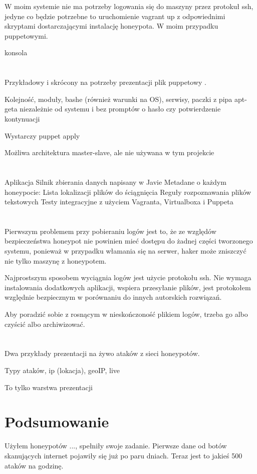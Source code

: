 \documentclass[runningheads,a4paper]{llncs}
\begin{document}
W moim systemie nie ma potrzeby logowania się do maszyny przez protokuł ssh, jedyne co będzie potrzebne to uruchomienie vagrant up z odpowiednimi skryptami dostarczającymi instalację honeypota. W moim przypadku puppetowymi.

konsola
\section{}
Przykładowy i skrócony na potrzeby prezentacji plik puppetowy .

Kolejność, moduły, bashe (również warunki na OS), serwisy, paczki z pipa apt-geta niezależnie od systemu i bez promptów o hasło czy potwierdzenie kontynuacji

Wystarczy puppet apply

Możliwa architektura master-slave, ale nie używana w tym projekcie

\section{}
Aplikacja
Silnik zbierania danych napisany w Javie
Metadane o każdym honeypocie:
Lista lokalizacji plików do ściągnięcia
Reguły rozpoznawania plików tekstowych
Testy integracyjne z użyciem Vagranta, Virtualboxa i Puppeta
\section{}
Pierwszym problemem przy pobieraniu logów jest to, że ze względów bezpieczeństwa honeypot nie powinien mieć dostępu do żadnej części tworzonego systemu, ponieważ w przypadku włamania się na serwer, haker może zniszczyć nie tylko maszynę z honeypotem.

Najprostszym sposobem wyciągnia logów jest użycie protokołu ssh. Nie wymaga instalowania dodatkowych aplikacji, wspiera przesyłanie plików, jest protokołem względnie bezpiecznym w porównaniu do innych autorskich rozwiązań.

Aby poradzić sobie z rosnącym w nieskończoność plikiem logów, trzeba go albo czyścić albo archiwizować.

\section{}
Dwa przykłady prezentacji na żywo ataków z sieci honeypotów.

Typy ataków, ip (lokacja), geoIP, live

To tylko warstwa prezentacji
\section{Podsumowanie}
Użyłem honeypotów ..., spełniły swoje zadanie. Pierwsze dane od botów skanujących internet pojawiły się już po paru dniach. Teraz jest to jakieś 500 ataków na godzinę.
\end{document}
